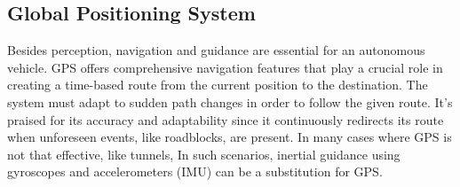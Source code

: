 \documentclass[10pt,oneside,english,a4paper]{article}
\begin{document}
\subsection{Global Positioning System}
\par Besides perception, navigation and guidance are essential for an autonomous vehicle. GPS offers comprehensive navigation features that play a crucial role in creating a time-based route from the current position to the destination. The system must adapt to sudden path changes in order to follow the given route. It's praised for its accuracy and adaptability since it continuously redirects its route when unforeseen events, like roadblocks, are present. In many cases where GPS is not that effective, like tunnels, In such scenarios, inertial guidance using gyroscopes and accelerometers (IMU) can be a substitution for GPS.
\cite{functionalarch, computerarch, stateoftheart, Sensorfusion, AIandIoT}
\end{document}
